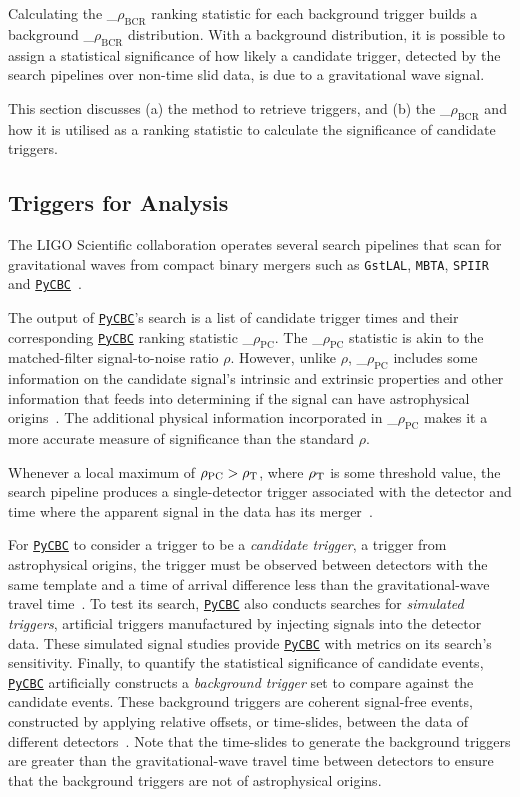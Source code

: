 \documentclass[%
 nofootinbib,
 amsmath,amssymb,
 aps,
 twocolumn
]{revtex4-2}
\newcommand{\pycbc}{{\sc \href{https://pycbc.org/}{\texttt{PyCBC}}}\xspace}
\newcommand{\mathcmd}[1]{{\sc \relax\ifmmode#1\else $#1$\fi}\xspace}
\newcommand{\bcr}{\mathcmd{\rho_\text{BCR}}}
\newcommand{\pycbcstat}{\mathcmd{\rho_\text{PC}}}
\newcommand{\snr}{\mathcmd{\rho}}
\begin{document}

Calculating the \bcr ranking statistic for each background trigger builds a background \bcr distribution. With a background distribution,  it is possible to assign a statistical significance of how likely a candidate trigger, detected by the search pipelines over non-time slid data, is due to a gravitational wave signal. 

This section discusses (a) the method to retrieve triggers, and (b) the \bcr and how it is utilised as a ranking statistic to calculate the significance of candidate triggers.


\subsection{Triggers for Analysis}

The LIGO Scientific collaboration operates several search pipelines that scan for gravitational waves from compact binary mergers such as \texttt{GstLAL}, \texttt{MBTA}, \texttt{SPIIR} and \pycbc~\cite{GWTC1}.

The output of \pycbc's search is a list of candidate trigger times and their corresponding \pycbc ranking statistic \pycbcstat. The \pycbcstat statistic is akin to the matched-filter signal-to-noise ratio \snr. However, unlike \snr, \pycbcstat includes some information on the candidate signal's intrinsic and extrinsic properties and other information that feeds into determining if the signal can have astrophysical origins~\cite{pycbc_og6}. The additional physical information incorporated in \pycbcstat makes it a more accurate measure of significance than the standard \snr. 

Whenever a local maximum of $\pycbcstat > \snr_\text{T}$, where $\snr_\text{T}$ is some threshold value, the search pipeline produces a single-detector trigger associated with the detector and time where the apparent signal in the data has its merger~\cite{pycbc_og6}.

For \pycbc to consider a trigger to be a \textit{candidate trigger}, a trigger from astrophysical origins, the trigger must be observed between detectors with the same template and a time of arrival difference less than the gravitational-wave travel time~\cite{pycbc_og1}. To test its search, \pycbc also conducts searches for \textit{simulated triggers}, artificial triggers manufactured by injecting signals into the detector data. These simulated signal studies provide \pycbc with metrics on its search's sensitivity. Finally, to quantify the statistical significance of candidate events, \pycbc artificially constructs a \textit{background trigger} set to compare against the candidate events. These background triggers are coherent signal-free events, constructed by applying relative offsets, or time-slides, between the data of different detectors~\cite{pycbc_og6}. Note that the time-slides to generate the background triggers are greater than the gravitational-wave travel time between detectors to ensure that the background triggers are not of astrophysical origins. 
\end{document}
